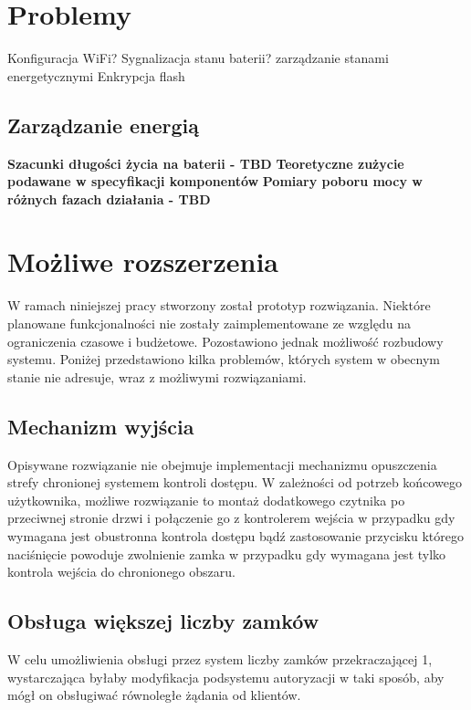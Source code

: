     \section{Problemy}

        Konfiguracja WiFi?
        Sygnalizacja stanu baterii?
        zarządzanie stanami energetycznymi
        Enkrypcja flash

        \subsection{Zarządzanie energią}

            \textbf{Szacunki długości życia na baterii - TBD}
            \textbf{Teoretyczne zużycie podawane w specyfikacji komponentów}
            \textbf{Pomiary poboru mocy w różnych fazach działania - TBD}

    \section{Możliwe rozszerzenia}

        W ramach niniejszej pracy stworzony został prototyp rozwiązania. Niektóre planowane funkcjonalności nie zostały zaimplementowane ze względu na ograniczenia czasowe i budżetowe. Pozostawiono jednak możliwość rozbudowy systemu. Poniżej przedstawiono kilka problemów, których system w obecnym stanie nie adresuje, wraz z możliwymi rozwiązaniami.

        \subsection{Mechanizm wyjścia}

            Opisywane rozwiązanie nie obejmuje implementacji mechanizmu opuszczenia strefy chronionej systemem kontroli dostępu. W zależności od potrzeb końcowego użytkownika, możliwe rozwiązanie to montaż dodatkowego czytnika po przeciwnej stronie drzwi i połączenie go z kontrolerem wejścia w przypadku gdy wymagana jest obustronna kontrola dostępu bądź zastosowanie przycisku którego naciśnięcie powoduje zwolnienie zamka w przypadku gdy wymagana jest tylko kontrola wejścia do chronionego obszaru.

        \subsection{Obsługa większej liczby zamków}

            W celu umożliwienia obsługi przez system liczby zamków przekraczającej 1, wystarczająca byłaby modyfikacja podsystemu autoryzacji w taki sposób, aby mógł on obsługiwać równoległe żądania od klientów.

